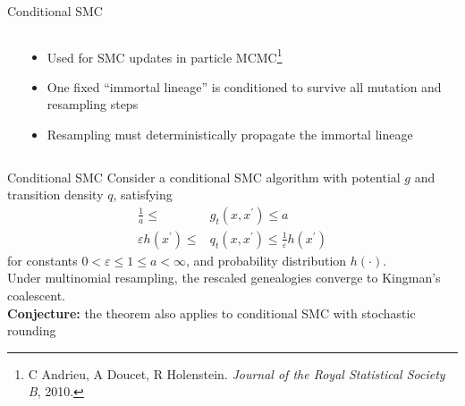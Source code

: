 \documentclass[aspectratio=169]{beamer}
\theoremstyle{definition}
\begin{document}
\begin{frame}{Conditional SMC}
\begin{columns}
\begin{column}{0.45\textwidth}
\centering
{}
\end{column}
\begin{column}{0.4\textwidth}
\begin{itemize}
\item Used for SMC updates in particle MCMC\footnote[frame]{C Andrieu, A Doucet, R Holenstein. \textit{Journal of the Royal Statistical Society B}, 2010.}
\item One fixed ``immortal lineage'' is conditioned to survive all mutation and resampling steps
\item Resampling must deterministically propagate the immortal lineage
\end{itemize}
\end{column}
\end{columns}
\end{frame}


\begin{frame}{Conditional SMC}
Consider a conditional SMC algorithm with potential $g$ and transition density $q$, satisfying
\begin{align*}
\frac{1}{a} \leq &g_t(x, x^\prime) \leq a \\
\varepsilon h(x^\prime) \leq &q_t(x, x^\prime) \leq \frac{1}{\varepsilon} h(x^\prime) 
\end{align*}
for constants $0<\varepsilon\leq 1\leq a<\infty$, and probability distribution $h(\cdot)$.\\[10pt]

Under multinomial resampling, the rescaled genealogies converge to Kingman's coalescent.\\[10pt]

\pause
\textbf{Conjecture:} the theorem also applies to conditional SMC with stochastic rounding
\end{frame}
\end{document}
